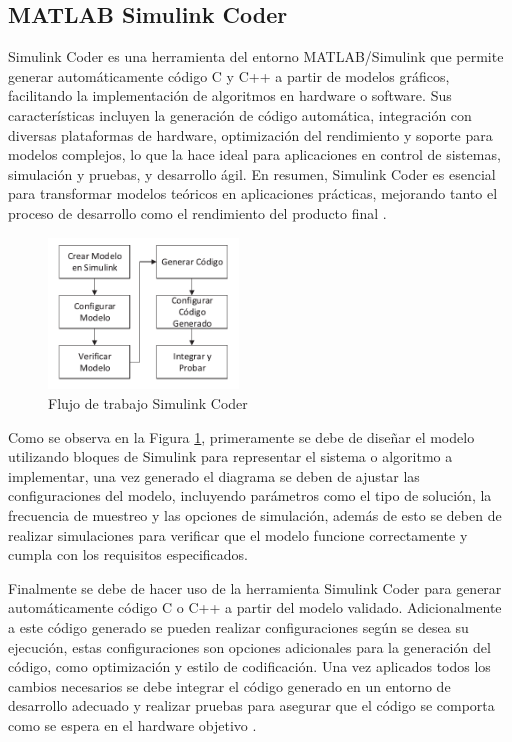 \subsection{MATLAB Simulink Coder}

Simulink Coder es una herramienta del entorno MATLAB/Simulink que permite generar automáticamente código C y C++ a partir de modelos gráficos, facilitando la implementación de algoritmos en hardware o software. Sus características incluyen la generación de código automática, integración con diversas plataformas de hardware, optimización del rendimiento y soporte para modelos complejos, lo que la hace ideal para aplicaciones en control de sistemas, simulación y pruebas, y desarrollo ágil. En resumen, Simulink Coder es esencial para transformar modelos teóricos en aplicaciones prácticas, mejorando tanto el proceso de desarrollo como el rendimiento del producto final \cite{hyl2017fast} \cite{krizan2014automatic}.


\begin{figure}[h!]
    \centering
    \includegraphics[width=0.45\textwidth]{fig/teorico/Flujo de trabajo simulink coder.pdf}
    \caption{Flujo de trabajo Simulink Coder}
    \label{fig:Simulink_coder_workflow}
\end{figure}

Como se observa en la Figura \ref{fig:Simulink_coder_workflow}, primeramente se debe de diseñar el modelo utilizando bloques de Simulink para representar el sistema o algoritmo a implementar, una vez generado el diagrama se deben de ajustar las configuraciones del modelo, incluyendo parámetros como el tipo de solución, la frecuencia de muestreo y las opciones de simulación, además de esto se deben de realizar simulaciones para verificar que el modelo funcione correctamente y cumpla con los requisitos especificados. 

Finalmente se debe de hacer uso de la herramienta Simulink Coder para generar automáticamente código C o C++ a partir del modelo validado. Adicionalmente a este código generado se pueden realizar configuraciones según se desea su ejecución, estas configuraciones son opciones adicionales para la generación del código, como optimización y estilo de codificación. Una vez aplicados todos los cambios necesarios se debe integrar el código generado en un entorno de desarrollo adecuado y realizar pruebas para asegurar que el código se comporta como se espera en el hardware objetivo \cite{krizan2014automatic}.

